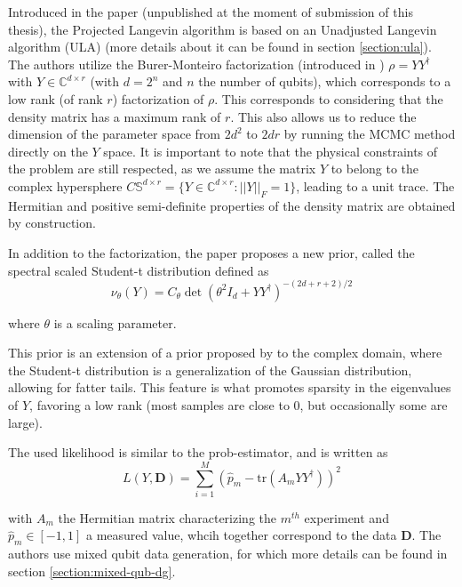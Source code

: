 \documentclass[12pt]{memoir}
\newcommand{\tr}{\text{tr}}
\newcommand{\mb}{\mathbf}
\begin{document}
Introduced in the \cite{meth:bayesian:Langevin:ACMT2024} paper (unpublished at the moment of submission of this thesis), the Projected Langevin algorithm is based on an Unadjusted Langevin algorithm (ULA) (more details about it can be found in section \ref{section:ula}). The authors utilize the Burer-Monteiro factorization (introduced in \cite{proj-langevin:Burer2003}) $\rho = Y Y^\dagger$ with $Y \in \mathbb{C}^{d \times r}$ (with $d=2^n$ and $n$ the number of qubits), which corresponds to a low rank (of rank $r$) factorization of $\rho$. This corresponds to considering that the density matrix has a maximum rank of $r$. This also allows us to reduce the dimension of the parameter space from $2d^2$ to $2dr$ by running the MCMC method directly on the $Y$ space. It is important to note that the physical constraints of the problem are still respected, as we assume the matrix $Y$ to belong to the complex hypersphere $C \mathbb{S}^{d\times r} = \{ Y \in \mathbb{C}^{d\times r}: ||Y||_F = 1\}$, leading to a unit trace. The Hermitian and positive semi-definite properties of the density matrix are obtained by construction.\medbreak


In addition to the factorization, the paper proposes a new prior, called the spectral scaled Student-t distribution defined as
\begin{equation}    
\nu_{\theta} (Y) = C_\theta \det(\theta^2I_d + YY^\dagger)^{-(2d+r+2)/2}
\end{equation}

where $\theta$ is a scaling parameter.\medbreak


This prior is an extension of a prior proposed by \cite{Dal20} to the complex domain, where the Student-t distribution is a generalization of the Gaussian distribution, allowing for fatter tails. This feature is what promotes sparsity in the eigenvalues of $Y$, favoring a low rank (most samples are close to 0, but occasionally some are large).\medbreak

The used likelihood is similar to the prob-estimator, and is written as
\begin{equation}
L(Y, \mb D) = \sum^{M}_{i=1} (\hat p_m - \tr(A_mYY^\dagger))^2
\end{equation}

with $A_m$ the Hermitian matrix characterizing the $m^{th}$ experiment and $\hat p_m \in [-1, 1]$ a measured value, whcih together correspond to the data $\mb D$. The authors use mixed qubit data generation, for which more details can be found in section \ref{section:mixed-qub-dg}. \medbreak
\end{document}
